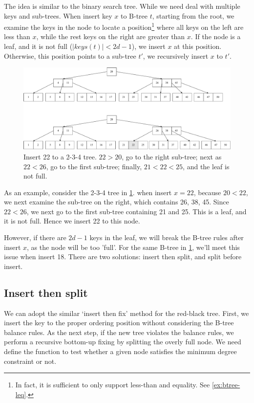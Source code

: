 \documentclass[b5paper]{article}
\begin{document}
The idea is similar to the binary search tree. While we need deal with multiple keys and sub-trees. When insert key $x$ to B-tree $t$, starting from the root, we examine the keys in the node to locate a position\footnote{In fact, it is sufficient to only support less-than and equality. See \cref{ex:btree-leq}.} where all keys on the left are less than $x$, while the rest keys on the right are greater than $x$. If the node is a leaf, and it is not full ($|keys(t)| < 2d - 1$), we insert $x$ at this position. Otherwise, this position points to a sub-tree $t'$, we recursively insert $x$ to $t'$.

\begin{figure}[htbp]
  \centering
  \includegraphics[scale=0.4]{img/btree-insert-example}
  \caption{Insert 22 to a 2-3-4 tree. $22 > 20$, go to the right sub-tree; next as $22 < 26$, go to the first sub-tree; finally, $21 < 22 < 25$, and the leaf is not full.}
  \label{fig:btree-insert-simple}
\end{figure}

As an example, consider the 2-3-4 tree in \cref{fig:btree-insert-simple}. when insert $x = 22$, because $20 < 22$, we next examine the sub-tree on the right, which contains 26, 38, 45. Since $22 < 26$, we next go to the first sub-tree containing 21 and 25. This is a leaf, and it is not full. Hence we insert 22 to this node.

However, if there are $2d - 1$ keys in the leaf, we will break the B-tree rules after insert $x$, as the node will be too 'full'. For the same B-tree in \cref{fig:btree-insert-simple}, we'll meet this issue when insert 18. There are two solutions: insert then split, and split before insert.

\subsection{Insert then split}

We can adopt the similar `insert then fix' method for the red-black tree. First, we insert the key to the proper ordering position without considering the B-tree balance rules. As the next step, if the new tree violates the balance rules, we perform a recursive bottom-up fixing by splitting the overly full node. We need define the function to test whether a given node satisfies the minimum degree constraint or not.
\end{document}

